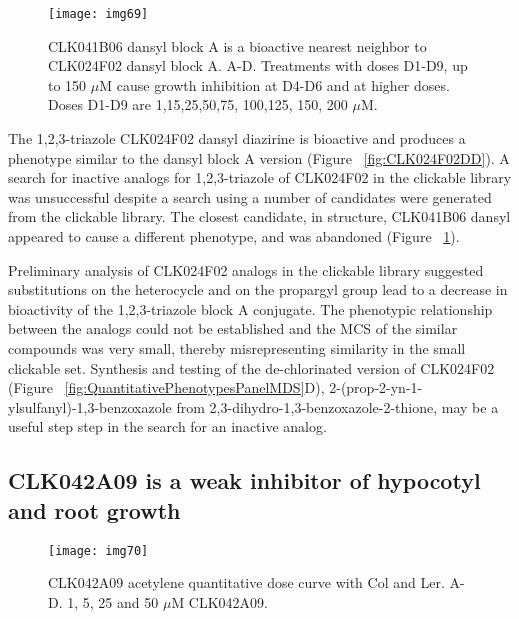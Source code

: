 \begin{figure}
\centering
\texttt{[image: img69]}
\caption{CLK041B06 dansyl block A is a bioactive nearest neighbor to CLK024F02 dansyl block A. A-D. Treatments with doses D1-D9, up to 150 $\mu$M cause growth inhibition at D4-D6 and at higher doses. Doses D1-D9 are 1,15,25,50,75, 100,125, 150, 200 $\mu$M.}
\label{fig:CLK041B06D}
\end{figure}


The 1,2,3-triazole CLK024F02 dansyl diazirine is bioactive and produces a phenotype similar to the dansyl block A version (Figure ~\ref{fig:CLK024F02DD}). A search for inactive analogs for 1,2,3-triazole of CLK024F02 in the clickable library was unsuccessful despite a search using a number of candidates were generated from the clickable library. The closest candidate, in structure, CLK041B06 dansyl appeared to cause a different phenotype, and was abandoned (Figure ~\ref{fig:CLK041B06D}).


Preliminary analysis of CLK024F02 analogs in the clickable library suggested substitutions on the heterocycle and on the propargyl group lead to a decrease in bioactivity of the 1,2,3-triazole block A conjugate. The phenotypic relationship between the analogs could not be established and the MCS of the similar compounds was very small, thereby misrepresenting similarity in the small clickable set. Synthesis and testing of the de-chlorinated version of CLK024F02 (Figure ~\ref{fig:QuantitativePhenotypesPanelMDS}D), 2-(prop-2-yn-1-ylsulfanyl)-1,3-benzoxazole from 2,3-dihydro-1,3-benzoxazole-2-thione, may be a useful step step in the search for an inactive analog. 


\subsection{CLK042A09 is a weak inhibitor of hypocotyl and root growth}

\begin{figure}
\centering
\texttt{[image: img70]}
\caption{CLK042A09 acetylene quantitative dose curve with Col and Ler. A-D. 1, 5, 25 and 50 $\mu$M CLK042A09.}
\label{fig:CLK042A09RH}
\end{figure}

